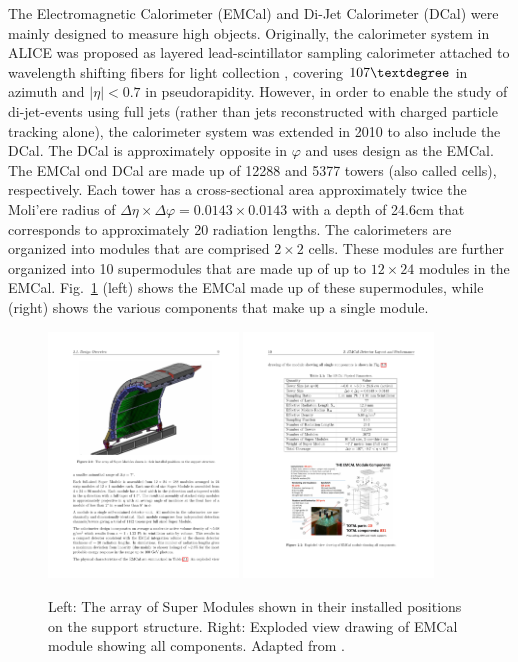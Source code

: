 The Electromagnetic Calorimeter (EMCal) and Di-Jet Calorimeter (DCal) were mainly designed to measure high \pt objects. Originally, the calorimeter system in ALICE was proposed as layered lead-scintillator sampling calorimeter attached to wavelength shifting fibers for light collection \cite{Blau2020}, covering $107\textdegree$ in azimuth and  $|\eta| < 0.7$ in pseudorapidity. However, in order to enable the study of di-jet-events using full jets (rather than jets reconstructed with charged particle tracking alone), the calorimeter system was extended in 2010 to also include the DCal. The DCal is approximately opposite in $\varphi$ and uses design as the EMCal. The EMCal ond DCal are made up of 12288 and 5377 towers (also called cells), respectively. Each tower has a cross-sectional area approximately twice the Moli'ere radius of $\Delta\eta\times\Delta\varphi = 0.0143\times0.0143$ with a depth of 24.6cm that corresponds to approximately 20 radiation lengths. The calorimeters are organized into modules that are comprised $2\times2$ cells. These modules are further organized into 10 supermodules that are made up of up to $12\times24$ modules in the EMCal. Fig.~\ref{fig:emcal} (left) shows the EMCal made up of these supermodules, while (right) shows the various components that make up a single module.

\begin{figure}[htpb]
  \centering
  \includegraphics[width=0.45\textwidth]{Experimental_Aparatus/emcal.pdf}
  \includegraphics[width=0.45\textwidth]{Experimental_Aparatus/module.pdf}
  \caption{Left: The array of Super Modules shown in their installed positions on the support structure. Right: Exploded view drawing of EMCal module showing all components. Adapted from \cite{Bellwied2010}.}
  \label{fig:emcal}
\end{figure}


